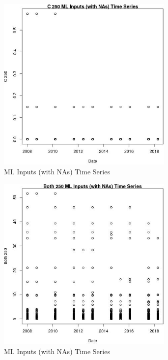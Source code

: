 \begin{figure} 
\centering  
\includegraphics[width=0.77\textwidth]{Code_Outputs/Report_ML_input_PM25_Step4_part_e_de_duplicated_aves_compiled_2019-05-18wNAs_C_250vDate.jpg} 
\caption{\label{fig:Report_ML_input_PM25_Step4_part_e_de_duplicated_aves_compiled_2019-05-18wNAsC_250vDate}ML Inputs (with NAs) Time Series} 
\end{figure} 
 

\begin{figure} 
\centering  
\includegraphics[width=0.77\textwidth]{Code_Outputs/Report_ML_input_PM25_Step4_part_e_de_duplicated_aves_compiled_2019-05-18wNAs_Both_250vDate.jpg} 
\caption{\label{fig:Report_ML_input_PM25_Step4_part_e_de_duplicated_aves_compiled_2019-05-18wNAsBoth_250vDate}ML Inputs (with NAs) Time Series} 
\end{figure} 
 

